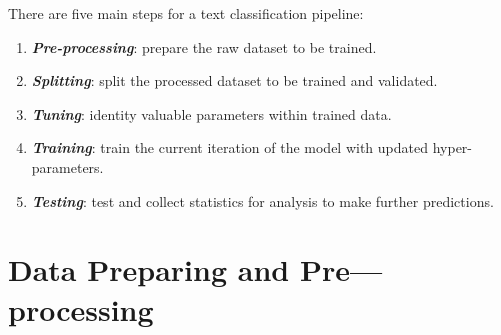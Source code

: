 There are five main steps for a text classification pipeline:

\begin{enumerate}
    \item \textbf{\textit{Pre-processing}}: prepare the raw dataset to be trained.
    \item \textbf{\textit{Splitting}}: split the processed dataset to be trained and validated.
    \item \textbf{\textit{Tuning}}: identity valuable parameters within trained data.
    \item \textbf{\textit{Training}}: train the current iteration of the model with updated hyper-parameters.
    \item \textbf{\textit{Testing}}: test and collect statistics for analysis to make further predictions.
\end{enumerate}

\section{Data Preparing and Pre---processing}